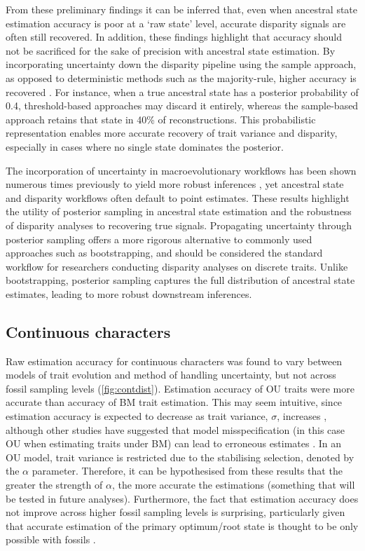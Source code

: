 \documentclass[titlepage]{article}
\begin{document}
From these preliminary findings it can be inferred that, even when ancestral state estimation accuracy is poor at a `raw state' level, accurate disparity signals are often still recovered.
In addition, these findings highlight that accuracy should not be sacrificed for the sake of precision with ancestral state estimation. 
By incorporating uncertainty down the disparity pipeline using the sample approach, as opposed to deterministic methods such as the majority-rule, higher accuracy is recovered \citep{joy2016ancestral}.
For instance, when a true ancestral state has a posterior probability of 0.4, threshold-based approaches may discard it entirely, whereas the sample-based approach retains that state in 40\% of reconstructions. 
This probabilistic representation enables more accurate recovery of trait variance and disparity, especially in cases where no single state dominates the posterior.

The incorporation of uncertainty in macroevolutionary workflows has been shown numerous times previously to yield more robust inferences \citep{slater2014robust, caetano2019estimating}, yet ancestral state and disparity workflows often default to point estimates.
These results highlight the utility of posterior sampling in ancestral state estimation and the robustness of disparity analyses to recovering true signals.
Propagating uncertainty through posterior sampling offers a more rigorous alternative to commonly used approaches such as bootstrapping, and should be considered the standard workflow for researchers conducting disparity analyses on discrete traits. 
Unlike bootstrapping, posterior sampling captures the full distribution of ancestral state estimates, leading to more robust downstream inferences.

\subsection{Continuous characters}
Raw estimation accuracy for continuous characters was found to vary between models of trait evolution and method of handling uncertainty, but not across fossil sampling levels (\autoref{fig:contdist}).
Estimation accuracy of OU traits were more accurate than accuracy of BM trait estimation.
This may seem intuitive, since estimation accuracy is expected to decrease as trait variance, $\sigma$, increases \citep{royer2016comparison}, although other studies have suggested that model misspecification (in this case OU when estimating traits under BM) can lead to erroneous estimates \citep{ho2014intrinsic}.
In an OU model, trait variance is restricted due to the stabilising selection, denoted by the $\alpha$ parameter. 
Therefore, it can be hypothesised from these results that the greater the strength of $\alpha$, the more accurate the estimations (something that will be tested in future analyses).
Furthermore, the fact that estimation accuracy does not improve across higher fossil sampling levels is surprising, particularly given that accurate estimation of the primary optimum/root state is thought to be only possible with fossils \citep{goswami2025phenomics}.
\end{document}
